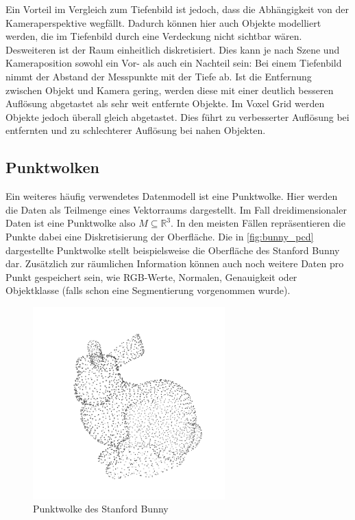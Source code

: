 Ein Vorteil im Vergleich zum Tiefenbild ist jedoch, dass die Abhängigkeit von der Kameraperspektive wegfällt.
Dadurch können hier auch Objekte modelliert werden, die im Tiefenbild durch eine Verdeckung nicht sichtbar wären.
Desweiteren ist der Raum einheitlich diskretisiert.
Dies kann je nach Szene und Kameraposition sowohl ein Vor- als auch ein Nachteil sein:
Bei einem Tiefenbild nimmt der Abstand der Messpunkte mit der Tiefe ab.
Ist die Entfernung zwischen Objekt und Kamera gering, werden diese mit einer deutlich besseren Auflösung abgetastet als sehr weit entfernte Objekte.
Im Voxel Grid werden Objekte jedoch überall gleich abgetastet.
Dies führt zu verbesserter Auflösung bei entfernten und zu schlechterer Auflösung bei nahen Objekten.


\subsection{Punktwolken}
\label{subsec:punktwolken}

Ein weiteres häufig verwendetes Datenmodell ist eine Punktwolke.
Hier werden die Daten als Teilmenge eines Vektorraums dargestellt.
Im Fall dreidimensionaler Daten ist eine Punktwolke also $M \subseteq \mathbb{R}^3$.
In den meisten Fällen repräsentieren die Punkte dabei eine Diskretisierung der Oberfläche.
Die in \autoref{fig:bunny_pcd} dargestellte Punktwolke stellt beispielsweise die Oberfläche des Stanford Bunny \cite{stanfordbunny} dar.
Zusätzlich zur räumlichen Information können auch noch weitere Daten pro Punkt gespeichert sein, wie RGB-Werte, Normalen, Genauigkeit oder Objektklasse (falls schon eine Segmentierung vorgenommen wurde).

\begin{figure}[ht]
	\centering
	\includegraphics[width=0.66\textwidth, frame]{images/bunny_pcd.png}
	\caption{Punktwolke des Stanford Bunny \cite{stanfordbunny}}
	\label{fig:bunny_pcd}
\end{figure}

